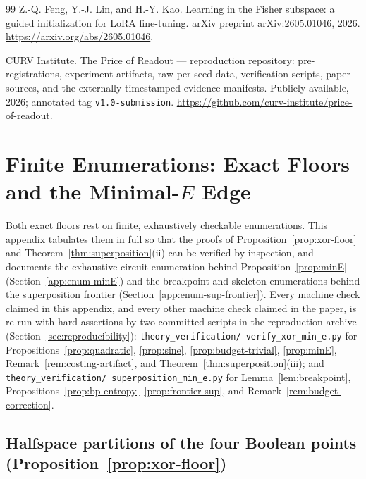 \documentclass[twocolumn,10pt]{article}
\theoremstyle{definition}
\theoremstyle{remark}
\begin{document}
\begin{thebibliography}{99}
Z.-Q. Feng, Y.-J. Lin, and H.-Y. Kao.
\newblock Learning in the Fisher subspace: a guided initialization for
LoRA fine-tuning.
\newblock arXiv preprint arXiv:2605.01046, 2026.
\newblock \url{https://arxiv.org/abs/2605.01046}.

CURV Institute.
\newblock The Price of Readout --- reproduction repository:
pre-registrations, experiment artifacts, raw per-seed data,
verification scripts, paper sources, and the externally timestamped
evidence manifests.
\newblock Publicly available, 2026; annotated tag
\texttt{v1.0-submission}.
\newblock \url{https://github.com/curv-institute/price-of-readout}.

\end{thebibliography}

\onecolumn
\appendix

\section{Finite Enumerations: Exact Floors and the
Minimal-\texorpdfstring{$E$}{E} Edge}
\label{app:enum}

Both exact floors rest on finite, exhaustively checkable enumerations.
This appendix tabulates them in full so that the proofs of
Proposition~\ref{prop:xor-floor} and
Theorem~\ref{thm:superposition}(ii) can be verified by inspection, and
documents the exhaustive circuit enumeration behind
Proposition~\ref{prop:minE} (Section~\ref{app:enum-minE}) and the
breakpoint and skeleton enumerations behind the superposition frontier
(Section~\ref{app:enum-sup-frontier}). Every
machine check claimed in this appendix, and every other machine
check claimed in the paper, is re-run with hard assertions by two
committed scripts in the reproduction archive
(Section~\ref{sec:reproducibility}):
\texttt{theory\_verification/\allowbreak
verify\_xor\_min\_e.py} for Propositions~\ref{prop:quadratic},
\ref{prop:sine}, \ref{prop:budget-trivial}, \ref{prop:minE},
Remark~\ref{rem:costing-artifact}, and
Theorem~\ref{thm:superposition}(iii); and
\texttt{theory\_verification/\allowbreak
superposition\_min\_e.py} for Lemma~\ref{lem:breakpoint},
Propositions~\ref{prop:bp-entropy}--\ref{prop:frontier-sup}, and
Remark~\ref{rem:budget-correction}.

\subsection{Halfspace partitions of the four Boolean points
(Proposition~\ref{prop:xor-floor})}
\label{app:enum-xor}
\end{document}
